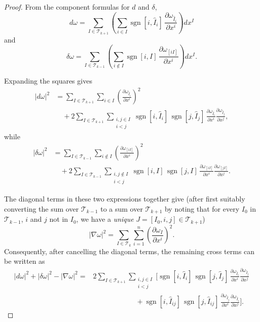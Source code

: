 \begin{proof}
From the component formulas for $d$ and $\delta$,
\[
    d\omega
    =
    \sum_{I\in\mathscr{T}_{k+1}}
    \left(
        \sum_{i\in I}
        \operatorname{sgn}[i,\widehat{I}_i]\,
        \frac{\partial\omega_{\widehat{I}_i}}
        {\partial x^i}
    \right)dx^I
\]
and
\[
    \delta\omega
    =
    \sum_{I\in\mathscr{T}_{k-1}}
    \left(
        \sum_{i\notin I}
        \operatorname{sgn}[i,I]\,
        \frac{\partial\omega_{[iI]}}
        {\partial x^i}
    \right)dx^I.
\]

Expanding the squares gives
\[
\begin{aligned}
|d\omega|^2
&=
\sum_{I\in\mathscr{T}_{k+1}}
\sum_{i\in I}
\left(
    \frac{\partial\omega_{\widehat{I}_i}}
    {\partial x^i}
\right)^2
\\
&\quad+
2\sum_{I\in\mathscr{T}_{k+1}}
\sum_{\substack{i,j\in I\\i<j}}
\operatorname{sgn}[i,\widehat{I}_i]\,
\operatorname{sgn}[j,\widehat{I}_j]\,
\frac{\partial\omega_{\widehat{I}_i}}{\partial x^i}
\frac{\partial\omega_{\widehat{I}_j}}{\partial x^j},
\end{aligned}
\tag{19}
\]
while
\[
\begin{aligned}
|\delta\omega|^2
&=
\sum_{I\in\mathscr{T}_{k-1}}
\sum_{i\notin I}
\left(
    \frac{\partial\omega_{[iI]}}
    {\partial x^i}
\right)^2
\\
&\quad+
2\sum_{I\in\mathscr{T}_{k-1}}
\sum_{\substack{i,j\notin I\\i<j}}
\operatorname{sgn}[i,I]\,
\operatorname{sgn}[j,I]\,
\frac{\partial\omega_{[iI]}}{\partial x^i}
\frac{\partial\omega_{[jI]}}{\partial x^j}.
\end{aligned}
\tag{20}
\]

The diagonal terms in these two expressions together give (after first suitably converting the sum over $\mathscr T_{k-1}$ to a sum over $\mathscr T_{k+1}$ by noting that for every $I_0$ in $\mathscr T_{k-1}$, $i$ and $j$ not in $I_0$, we have a \emph{unique} $J=[I_0,i,j]\in \mathscr T_{k+1}$)
\[
    |\nabla\omega|^2
    =
    \sum_{I\in\mathscr{T}_k}
    \sum_{i=1}^n
    \left(
        \frac{\partial\omega_I}{\partial x^i}
    \right)^2.
\]
Consequently, after cancelling the diagonal terms, the remaining
cross terms can be written as
\[
\begin{aligned}
|d\omega|^2+|\delta\omega|^2-|\nabla\omega|^2
={}&
2\sum_{I\in\mathscr{T}_{k+1}}
\sum_{\substack{i,j\in I\\i<j}}
\Bigg[
\operatorname{sgn}[i,\widehat{I}_i]\,
\operatorname{sgn}[j,\widehat{I}_j]\,
\frac{\partial\omega_{\widehat{I}_i}}{\partial x^i}
\frac{\partial\omega_{\widehat{I}_j}}{\partial x^j}
\\
&\qquad\qquad\qquad+
\operatorname{sgn}[i,\widehat{I}_{ij}]\,
\operatorname{sgn}[j,\widehat{I}_{ij}]\,
\frac{\partial\omega_{\widehat{I}_j}}{\partial x^i}
\frac{\partial\omega_{\widehat{I}_i}}{\partial x^j}
\Bigg].
\end{aligned}
\]


\end{proof}
